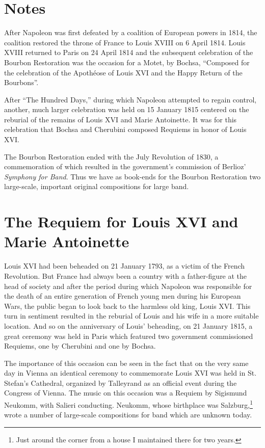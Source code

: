 \documentclass[a4paper, oneside, 12pt]{memoir}
\begin{document}
\section* {Notes}
\normalsize
After Napoleon was first defeated by a coalition of European powers in 1814, the coalition restored the throne of France to Louis XVIII on 6 April 1814. Louis XVIII returned to Paris on 24 April 1814 and the subsequent celebration of the Bourbon Restoration was the occasion for a Motet, by Bochsa, ``Composed for the celebration of the Apoth\'{e}ose of Louis XVI and the Happy Return of the Bourbons''.

After ``The Hundred Days,'' during which Napoleon attempted to regain control, another, much larger celebration was held on 15 January 1815 centered on the reburial of the remains of Louis XVI and Marie Antoinette. It was for this celebration that Bochsa and Cherubini composed Requiems in honor of Louis XVI.

The Bourbon Restoration ended with the July Revolution of 1830, a commemoration of which resulted in the government's commission of Berlioz' \textit{Symphony for Band}.  Thus we have as book-ends for the Bourbon Restoration two large-scale, important original compositions for large band.


\section*{The Requiem for Louis XVI and Marie Antoinette}

Louis XVI had been beheaded on 21 January 1793, as a victim of the French Revolution. But France had always been a country with a father-figure at the head of society and after the period during which Napoleon was responsible for the death of an entire generation of French young men during his European Wars, the public began to look back to the harmless old king, Louis XVI. This turn in sentiment resulted in the reburial of Louis and his wife in a more suitable location. And so on the anniversary of  Louis' beheading, on 21 January 1815, a great ceremony was held in Paris which featured two government commissioned Requiems, one by Cherubini and one by Bochsa.

The importance of this occasion can be seen in the fact that on the very same day in Vienna an identical ceremony to commemorate Louis XVI was held in St. Stefan's Cathedral, organized by Talleyrand as an official event during the Congress of Vienna. The music on this occasion was a Requiem by Sigismund Neukomm, with Salieri conducting. Neukomm, whose birthplace was Salzburg,\footnote{Just around the corner from a house I maintained there for two years.} wrote a number of large-scale compositions for band which are unknown today.
\end{document}
